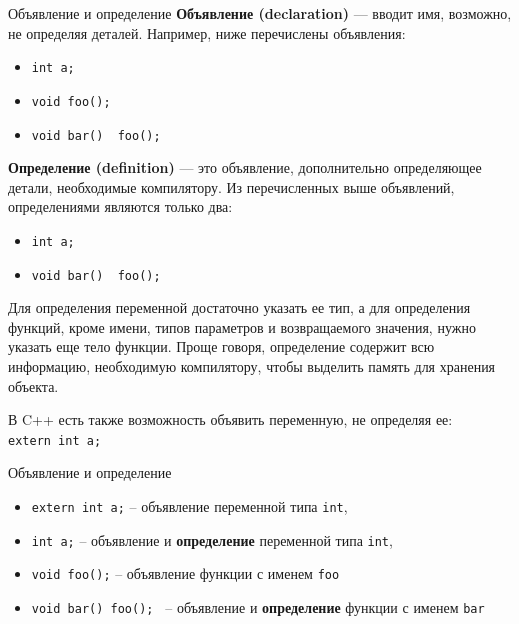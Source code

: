 \documentclass[9pt]{beamer}
\begin{document}
\begin{frame}[fragile]{Объявление и определение}
    \textbf{Объявление (declaration)} — вводит имя, возможно, не определяя деталей. Например, ниже перечислены объявления:
    \begin{itemize}
        \item \texttt{int a;}
        \item \texttt{void foo();}
        \item \texttt{void bar() { foo(); }}
    \end{itemize}

    \textbf{Определение (definition)} — это объявление, дополнительно определяющее детали, необходимые компилятору. Из перечисленных выше объявлений, определениями являются только два:
    \begin{itemize}
        \item \texttt{int a;}
        \item \texttt{void bar() { foo(); }}
    \end{itemize}

    Для определения переменной достаточно указать ее тип, а для определения функций, кроме имени, типов параметров и возвращаемого значения, нужно указать еще тело функции. Проще говоря, определение содержит всю информацию, необходимую компилятору, чтобы выделить память для хранения объекта.
    
    В C++ есть также возможность объявить переменную, не определяя ее: \\
    \texttt{extern int a;}
\end{frame}

\begin{frame}[fragile]{Объявление и определение}
    \begin{itemize}
        \item \texttt{extern int a;} -- объявление переменной типа \texttt{int},
        \item \texttt{int a;} -- объявление и \textbf{определение} переменной типа \texttt{int},
        \item \texttt{void foo();} -- объявление функции с именем \texttt{foo}
        \item \texttt{void bar(){ foo(); }} -- объявление и \textbf{определение} функции с именем \texttt{bar}
    \end{itemize}
\end{frame}
\end{document}
